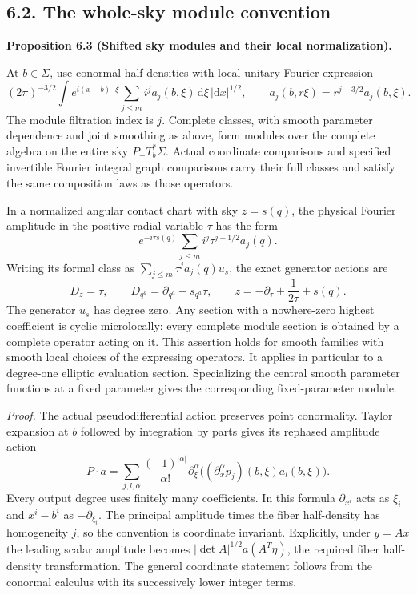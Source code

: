 \documentclass[
  english,
  11pt,
  reqno]{amsart}
\makeatletter
\newcommand{\paperdisplaynext}{%
  \let\paper@savedstartsection\@startsection
  \def\@startsection##1##2##3##4##5##6{%
    \let\@startsection\paper@savedstartsection
    \@tempskipa ##5\relax
    \ifdim\@tempskipa<\z@
      \def\paper@afterskip{.35\baselineskip}%
    \else
      \def\paper@afterskip{##5}%
    \fi
    \@startsection{##1}{##2}{##3}{##4}{\paper@afterskip}{##6}}}
\newcommand{\paperdisplaysection}{\paperdisplaynext\subsection}
\newcommand{\pandocstatementheading}[1]{%
  \par\if@nobreak\else
    \addpenalty{\@beginparpenalty}%
    \addvspace{.5\baselineskip plus .2\baselineskip minus .2\baselineskip}%
  \fi
  {\normalfont\bfseries #1\par}%
  \nobreak\@afterindenttrue\@afterheading
}
\let\paper@displaysection\paperdisplaysection
\renewcommand{\paperdisplaysection}[1]{%
  \let\paper@savedhangfrom\@hangfrom
  \long\def\@hangfrom##1##2{%
    \paper@savedhangfrom{##1}{\paper@headingparagraph##2}}%
  \paper@displaysection{#1}%
  \let\@hangfrom\paper@savedhangfrom}
\makeatother
\begin{document}
\paperdisplaysection{6.2. The whole-sky module
convention}\label{the-whole-sky-module-convention}\label{sec:online-shifted-lagrangian-modules}

\pandocstatementheading{\leavevmode{}\label{prop:online-shifted-sky-modules}Proposition 6.3 (Shifted sky modules and their local normalization).}

At \(b\in\Sigma\), use conormal half-densities with local unitary
Fourier expression%
 \[
(2\pi)^{-3/2}\int
 e^{i(x-b)\cdot\xi}
 \sum_{j\le m}i^j a_j(b,\xi)\,\mathrm d\xi
 \,|\mathrm dx|^{1/2},
\qquad
a_j(b,r\xi)=r^{j-3/2}a_j(b,\xi).
\] The module filtration index is \(j\). Complete classes, with smooth
parameter dependence and joint smoothing as above, form modules over the
complete algebra on the entire sky \(P_+T_b^*\Sigma\). Actual coordinate
comparisons and specified invertible Fourier integral graph comparisons
carry their full classes and satisfy the same composition laws as those
operators.

In a normalized angular contact chart with sky \(z=s(q)\), the physical
Fourier amplitude in the positive radial variable \(\tau\) has the form%
 \[
e^{-i\tau s(q)}\sum_{j\le m}i^j\tau^{j-1/2}a_j(q).
\] Writing its formal class as \(\sum_{j\le m}\tau^j a_j(q)u_s\), the
exact generator actions are%
 \[
D_z=\tau,\qquad
D_{q^a}=\partial_{q^a}-s_{q^a}\tau,
\qquad
z=-\partial_\tau+\frac1{2\tau}+s(q).
\] The generator \(u_s\) has degree zero. Any section with a
nowhere-zero highest coefficient is cyclic microlocally: every complete
module section is obtained by a complete operator acting on it. This
assertion holds for smooth families with smooth local choices of the
expressing operators. It applies in particular to a degree-one elliptic
evaluation section. Specializing the central smooth parameter functions
at a fixed parameter gives the corresponding fixed-parameter module.

\emph{Proof.} The actual pseudodifferential action preserves point
conormality. Taylor expansion at \(b\) followed by integration by parts
gives its rephased amplitude action%
 \[
P\cdot a=
\sum_{j,l,\alpha}\frac{(-1)^{|\alpha|}}{\alpha!}
\partial_\xi^\alpha
\bigl((\partial_x^\alpha p_j)(b,\xi)a_l(b,\xi)\bigr).
\] Every output degree uses finitely many coefficients. In this formula
\(\partial_{x^i}\) acts as \(\xi_i\) and \(x^i-b^i\) as
\(-\partial_{\xi_i}\). The principal amplitude times the fiber
half-density has homogeneity \(j\), so the convention is coordinate
invariant. Explicitly, under \(y=Ax\) the leading scalar amplitude
becomes \(|\det A|^{1/2}a(A^T\eta)\), the required fiber half-density
transformation. The general coordinate statement follows from the
conormal calculus with its successively lower integer terms.
\end{document}
